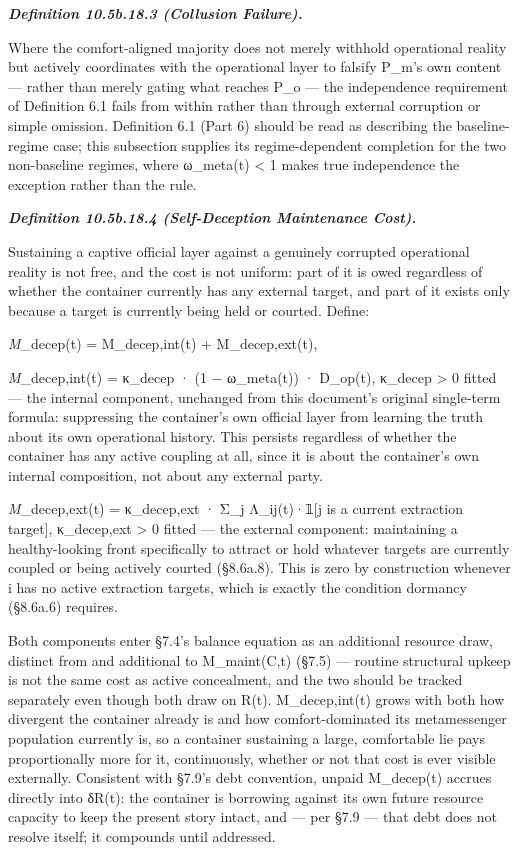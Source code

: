 \documentclass[
]{article}
\begin{document}
\emph{\textbf{Definition 10.5b.18.3 (Collusion Failure).}}

Where the comfort-aligned majority does not merely withhold operational
reality but actively coordinates with the operational layer to falsify
P\_m's own content --- rather than merely gating what reaches P\_o ---
the independence requirement of Definition 6.1 fails from within rather
than through external corruption or simple omission. Definition 6.1
(Part 6) should be read as describing the baseline-regime case; this
subsection supplies its regime-dependent completion for the two
non-baseline regimes, where ω\_meta(t) \textless{} 1 makes true
independence the exception rather than the rule.

\emph{\textbf{Definition 10.5b.18.4 (Self-Deception Maintenance Cost).}}

Sustaining a captive official layer against a genuinely corrupted
operational reality is not free, and the cost is not uniform: part of it
is owed regardless of whether the container currently has any external
target, and part of it exists only because a target is currently being
held or courted. Define:

\emph{M}\_decep(t) = M\_decep,int(t) + M\_decep,ext(t),

\emph{M}\_decep,int(t) = κ\_decep · (1 − ω\_meta(t)) · D\_op(t),
κ\_decep \textgreater{} 0 fitted --- the internal component, unchanged
from this document's original single-term formula: suppressing the
container's own official layer from learning the truth about its own
operational history. This persists regardless of whether the container
has any active coupling at all, since it is about the container's own
internal composition, not about any external party.

\emph{M}\_decep,ext(t) = κ\_decep,ext · Σ\_j Λ\_ij(t)·𝟙{[}j is a current
extraction target{]}, κ\_decep,ext \textgreater{} 0 fitted --- the
external component: maintaining a healthy-looking front specifically to
attract or hold whatever targets are currently coupled or being actively
courted (§8.6a.8). This is zero by construction whenever i has no active
extraction targets, which is exactly the condition dormancy (§8.6a.6)
requires.

Both components enter §7.4's balance equation as an additional resource
draw, distinct from and additional to M\_maint(C,t) (§7.5) --- routine
structural upkeep is not the same cost as active concealment, and the
two should be tracked separately even though both draw on R(t).
M\_decep,int(t) grows with both how divergent the container already is
and how comfort-dominated its metamessenger population currently is, so
a container sustaining a large, comfortable lie pays proportionally more
for it, continuously, whether or not that cost is ever visible
externally. Consistent with §7.9's debt convention, unpaid M\_decep(t)
accrues directly into δR(t): the container is borrowing against its own
future resource capacity to keep the present story intact, and --- per
§7.9 --- that debt does not resolve itself; it compounds until
addressed.
\end{document}
